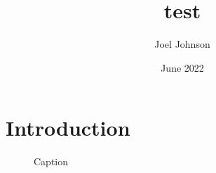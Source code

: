 \documentclass{article}
\title{test}
\author{Joel Johnson}
\date{June 2022}
\begin{document}
\maketitle

\section{Introduction}

\begin{figure}
    \centering
    \caption{Caption}
    \label{fig:my_label}
\end{figure}
\end{document}
